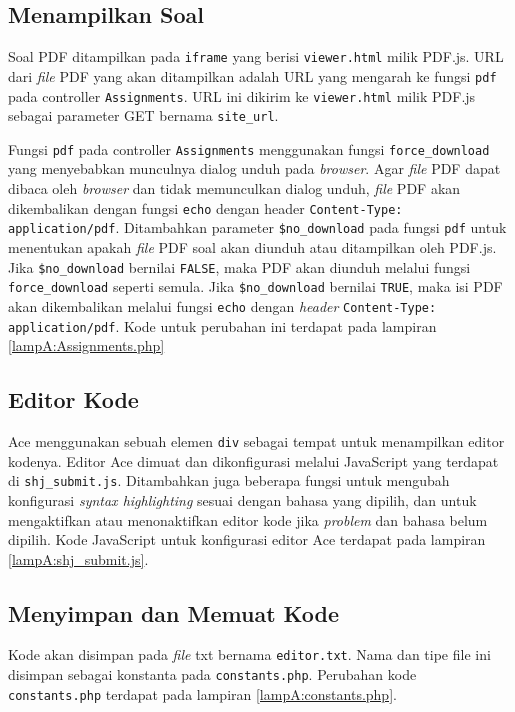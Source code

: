 \subsection{Menampilkan Soal}
\label{subsec:5:soal}

Soal PDF ditampilkan pada \verb|iframe| yang berisi \verb|viewer.html| milik PDF.js. URL dari \textit{file} PDF yang akan ditampilkan adalah URL yang mengarah ke fungsi \verb|pdf| pada controller \verb|Assignments|. URL ini dikirim ke \verb|viewer.html| milik PDF.js sebagai parameter GET bernama \verb|site_url|.

Fungsi \verb|pdf| pada controller \verb|Assignments| menggunakan fungsi \verb|force_download| yang menyebabkan munculnya dialog unduh pada \textit{browser}. Agar \textit{file} PDF dapat dibaca oleh \textit{browser} dan tidak memunculkan dialog unduh, \textit{file} PDF akan dikembalikan dengan fungsi \verb|echo| dengan header \verb|Content-Type: application/pdf|. Ditambahkan parameter \verb|$no_download| pada fungsi \verb|pdf| untuk menentukan apakah \textit{file} PDF soal akan diunduh atau ditampilkan oleh PDF.js. Jika \verb|$no_download| bernilai \verb|FALSE|, maka PDF akan diunduh melalui fungsi \verb|force_download| seperti semula. Jika \verb|$no_download| bernilai \verb|TRUE|, maka isi PDF akan dikembalikan melalui fungsi \verb|echo| dengan \textit{header} \verb|Content-Type: application/pdf|. Kode untuk perubahan ini terdapat pada lampiran \ref{lampA:Assignments.php}

\subsection{Editor Kode}
\label{subsec:5:editor}

Ace menggunakan sebuah elemen \verb|div| sebagai tempat untuk menampilkan editor kodenya. Editor Ace dimuat dan dikonfigurasi melalui JavaScript yang terdapat di \verb|shj_submit.js|. Ditambahkan juga beberapa fungsi untuk mengubah konfigurasi \textit{syntax highlighting} sesuai dengan bahasa yang dipilih, dan untuk mengaktifkan atau menonaktifkan editor kode jika \textit{problem} dan bahasa belum dipilih. Kode JavaScript untuk konfigurasi editor Ace terdapat pada lampiran \ref{lampA:shj_submit.js}.

\subsection{Menyimpan dan Memuat Kode}
\label{subsec:5:simpan}

Kode akan disimpan pada \textit{file} txt bernama \verb|editor.txt|. Nama dan tipe file ini disimpan sebagai konstanta pada \verb|constants.php|. Perubahan kode \verb|constants.php| terdapat pada lampiran \ref{lampA:constants.php}.

